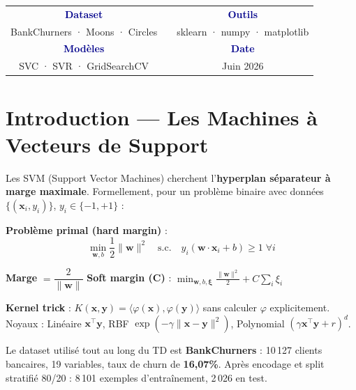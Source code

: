 \documentclass[12pt,a4paper]{article}
\begin{document}
\begin{titlepage}
\vfill
\begin{center}
\begin{tabular}{ccc}
  \textcolor{darkblue}{\textbf{Dataset}} & \quad & \textcolor{darkblue}{\textbf{Outils}} \\
  \textcolor{tealcolor}{BankChurners · Moons · Circles} & & \textcolor{tealcolor}{sklearn · numpy · matplotlib} \\[1em]
  \textcolor{darkblue}{\textbf{Modèles}} & & \textcolor{darkblue}{\textbf{Date}} \\
  \textcolor{tealcolor}{SVC · SVR · GridSearchCV} & & \textcolor{tealcolor}{Juin 2026}
\end{tabular}
\end{center}
\end{titlepage}

\tableofcontents
\newpage

\section{Introduction — Les Machines à Vecteurs de Support}

\begin{theorbox}
Les SVM (Support Vector Machines) cherchent l'\textbf{hyperplan séparateur à marge maximale}. Formellement, pour un problème binaire avec données $\{(\mathbf{x}_i, y_i)\}$, $y_i \in \{-1, +1\}$ :

\textbf{Problème primal (hard margin)} :
\[
\min_{\mathbf{w}, b} \frac{1}{2}\|\mathbf{w}\|^2 \quad \text{s.c.} \quad y_i(\mathbf{w}\cdot\mathbf{x}_i + b) \geq 1 \;\forall i
\]

\textbf{Marge} $= \dfrac{2}{\|\mathbf{w}\|}$ \qquad
\textbf{Soft margin (C)} : $\displaystyle\min_{\mathbf{w},b,\bm{\xi}} \frac{\|\mathbf{w}\|^2}{2} + C\sum_i\xi_i$

\textbf{Kernel trick} : $K(\mathbf{x},\mathbf{y}) = \langle\varphi(\mathbf{x}),\varphi(\mathbf{y})\rangle$ sans calculer $\varphi$ explicitement.
Noyaux : Linéaire $\mathbf{x}^\top\mathbf{y}$, RBF $\exp(-\gamma\|\mathbf{x}-\mathbf{y}\|^2)$, Polynomial $(\gamma\mathbf{x}^\top\mathbf{y}+r)^d$.
\end{theorbox}

Le dataset utilisé tout au long du TD est \textbf{BankChurners} : 10\,127 clients bancaires, 19 variables, taux de churn de \textbf{16,07\%}. Après encodage et split stratifié 80/20 : 8\,101 exemples d'entraînement, 2\,026 en test.
\end{document}

